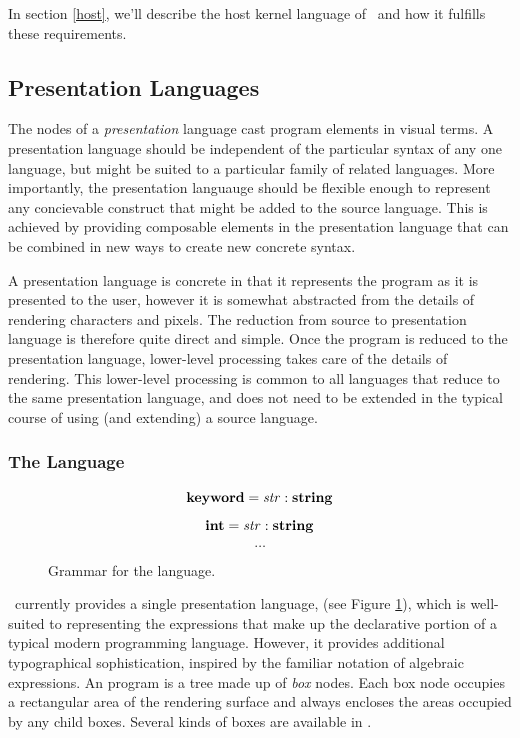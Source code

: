 In section \ref{host}, we'll describe the host kernel language of \Meta\ and how it fulfills these requirements.


\subsection{Presentation Languages}
The nodes of a \emph{presentation} language cast program elements in visual terms. A presentation language should be independent of the particular syntax of any one language, but might be suited to a particular family of related languages. More importantly, the presentation languauge should be flexible enough to represent any concievable construct that might be added to the source language. This is achieved by providing composable elements in the presentation language that can be combined in new ways to create new concrete syntax.

A presentation language is concrete in that it represents the program as it is presented to the user, however it is somewhat abstracted from the details of rendering characters and pixels. The reduction from source to presentation language is therefore quite direct and simple. Once the program is reduced to the presentation language, lower-level processing takes care of the details of rendering. This lower-level processing is common to all languages that reduce to the same presentation language, and does not need to be extended in the typical course of using (and extending) a source language.


\subsubsection{The  Language}

\begin{figure}
$$\textbf{keyword} = \mathit{str} : \textbf{string}$$
$$\textbf{int} = \mathit{str} : \textbf{string}$$
$$\dots$$
\caption{\label{fig-expr} Grammar for the  language.}
\end{figure}

\Meta\ currently provides a single presentation language,  (see Figure \ref{fig-expr}), which is well-suited to representing the expressions that make up the declarative portion of a typical modern programming language. However, it provides additional typographical sophistication, inspired by the familiar notation of algebraic expressions. An  program is a tree made up of \emph{box} nodes. Each box node occupies a rectangular area of the rendering surface and always encloses the areas occupied by any child boxes. Several kinds of boxes are available in .


